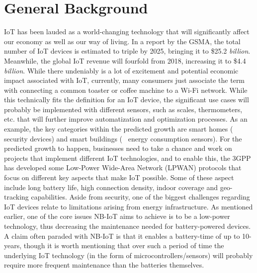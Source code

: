 






\section{General Background}
IoT has been lauded as a world-changing technology that will significantly affect our economy as well as our way of living. In a report by the GSMA, the total number of IoT devices is estimated to triple by 2025, bringing it to \$25.2 \textit{billion}.\cite{gsma-report} Meanwhile, the global IoT revenue will fourfold from 2018, increasing it to \$4.4 \textit{billion}.\cite{gsma-report} While there undeniably is a lot of excitement and potential economic impact associated with IoT, currently, many consumers just associate the term with connecting a common toaster or coffee machine to a Wi-Fi network. While this technically fits the definition for an IoT device,\cite{what_is_iot} the significant use cases will probably be implemented with different sensors, such as scales, thermometers, etc. that will further improve automatization and optimization processes. As an example, the key categories within the predicted growth are smart homes (\eg~ security devices) and smart buildings (\eg~ energy consumption sensors).\cite{gsma-report} For the predicted growth to happen, businesses need to take a chance and work on projects that implement different IoT technologies, and to enable this, the 3GPP has developed some Low-Power Wide-Area Network (LPWAN) protocols that focus on different key aspects that make IoT possible. Some of these aspect include long battery life, high connection density, indoor coverage and geo-tracking capabilities. Aside from security, one of the biggest challenges regarding IoT devices relate to limitations arising from energy infrastructure. As mentioned earlier, one of the core issues NB-IoT aims to achieve is to be a low-power technology, thus decreasing the maintenance needed for battery-powered devices. A claim often paraded with NB-IoT is that it enables a battery-time of up to 10-years,\cite{gsma-nb-iot} though it is worth mentioning that over such a period of time the underlying IoT technology (in the form of microcontrollers/sensors) will probably require more frequent maintenance than the batteries themselves.

